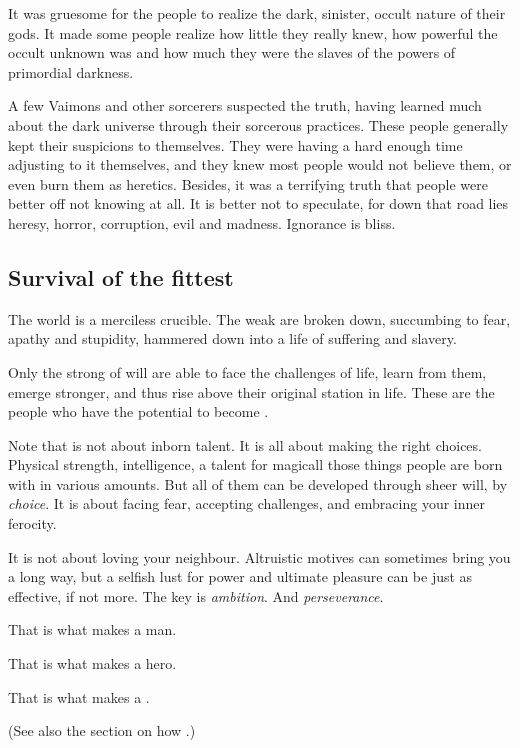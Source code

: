 It was gruesome for the people to realize the dark, sinister, occult nature of their gods.
It made some people realize how little they really knew, how powerful the occult unknown was and how much they were the slaves of the powers of primordial darkness.

A few Vaimons and other sorcerers suspected the truth, having learned much about the dark universe through their sorcerous practices.
These people generally kept their suspicions to themselves.
They were having a hard enough time adjusting to it themselves, and they knew most people would not believe them, or even burn them as heretics. 
Besides, it was a terrifying truth that people were better off not knowing at all.
It is better not to speculate, for down that road lies heresy, horror, corruption, evil and madness.
Ignorance is bliss.







\subsection{Survival of the fittest}
The world is a merciless crucible. 
The weak are broken down, succumbing to fear, apathy and stupidity, hammered down into a life of suffering and slavery. 

Only the strong of will are able to face the challenges of life, learn from them, emerge stronger, and thus rise above their original station in life. 
These are the people who have the potential to become \vertices. 

Note that  is not about inborn talent. 
It is all about making the right choices. 
Physical strength, intelligence, a talent for magic\dash all those things people are born with in various amounts. 
But all of them can be developed through sheer will, by \emph{choice}. 
It is about facing fear, accepting challenges, and embracing your inner ferocity. 

It is not about loving your neighbour. 
Altruistic motives can sometimes bring you a long way, but a selfish lust for power and ultimate pleasure can be just as effective, if not more. 
The key is \emph{ambition}. And \emph{perseverance}. 

That is what makes a man. 

That is what makes a hero. 

That is what makes a \vertex. 

(See also the section on how .)















